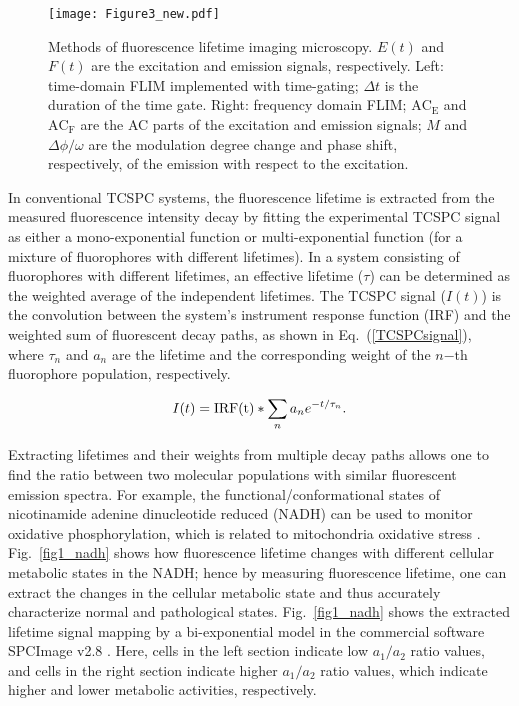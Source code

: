 \documentclass[12pt]{iopart}
\begin{document}
\begin{figure}[!t]
\centering
\texttt{[image: Figure3\_new.pdf]}
\caption{Methods of fluorescence lifetime imaging microscopy. $E(t)$ and $F(t)$ are the excitation and emission signals, respectively. Left: time-domain FLIM implemented with time-gating; $\Delta t$ is the duration of the time gate. Right: frequency domain FLIM; $\mathrm{AC_E}$ and $\mathrm{AC_F}$ are the AC parts of the excitation and emission signals; $M$ and $\Delta \phi/\omega$ are the modulation degree change and phase shift, respectively, of the emission with respect to the excitation.} \label{td_fd_illu}
\end{figure}

In conventional TCSPC systems, the fluorescence lifetime is extracted from the measured fluorescence intensity decay by fitting the experimental TCSPC signal as either a mono-exponential function or multi-exponential function (for a mixture of fluorophores with different lifetimes). In a system consisting of fluorophores with different lifetimes, an effective lifetime ($\tau$) can be determined as the weighted average of the independent lifetimes. The TCSPC signal ($I(t)$) is the convolution between the system's instrument response function (IRF) and the weighted sum of fluorescent decay paths, as shown in Eq.~(\ref{TCSPCsignal}), where $\tau_n$ and $a_n$ are the lifetime and the corresponding weight of the $n\mathrm{-th}$ fluorophore population, respectively. 

\begin{equation}
\centering
    I(t) = \mathrm{IRF(t)} \ast \sum_n { a_n e^{-t/\tau_n}}.\label{TCSPCsignal}
\end{equation}

Extracting lifetimes and their weights from multiple decay paths allows one to find the ratio between two molecular populations with similar fluorescent emission spectra. For example, the functional/conformational states of nicotinamide adenine dinucleotide reduced (NADH) can be used to monitor oxidative phosphorylation, which is related to mitochondria oxidative stress \cite{nadh}. Fig.~\ref{fig1_nadh} shows how fluorescence lifetime changes with different cellular metabolic states in the NADH; hence by measuring fluorescence lifetime, one can extract the changes in the cellular metabolic state and thus accurately characterize normal and pathological states. Fig.~\ref{fig1_nadh} shows the extracted lifetime signal mapping by a bi-exponential model in the commercial software SPCImage v2.8 \cite{spcimage}. Here, cells in the left section indicate low $a_{1}/a_{2}$ ratio values, and cells in the right section indicate higher $a_{1}/a_{2}$ ratio values, which indicate higher and lower metabolic activities, respectively.    
\end{document}
